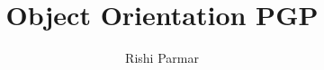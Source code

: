 \documentclass{article}
\begin{document}
\title{Object Orientation PGP}
\author{Rishi Parmar}

\maketitle
\newpage
{}
\hypertarget{MyToc}{}
\tableofcontents
\newpage
\end{document}
